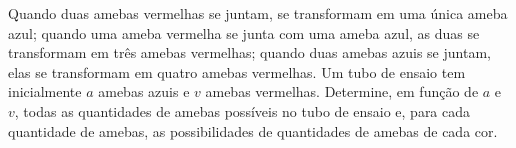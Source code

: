 Quando duas amebas vermelhas se juntam, se transformam em uma única ameba azul; quando uma ameba vermelha se junta com uma ameba azul, as duas se transformam em três amebas vermelhas; quando duas amebas azuis se juntam, elas se transformam em quatro amebas vermelhas.
Um tubo de ensaio tem inicialmente $a$ amebas azuis e $v$ amebas vermelhas.
Determine, em função de $a$ e $v$, todas as quantidades de amebas possíveis no tubo de ensaio e, para cada quantidade de amebas, as possibilidades de quantidades de amebas de cada cor.